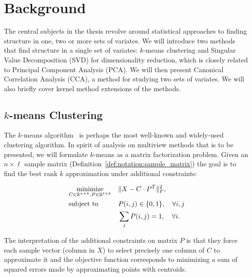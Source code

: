 %
\chapter{Background}\label{chap:background}

The central subjects in the thesis revolve around statistical approaches to finding structure in one, two or more sets of variates. We will
introduce two methods that find structure in a single set of variates: $k$-means clustering and Singular Value Decomposition (SVD) for dimensionality reduction, which is closely related to Principal Component Analysis (PCA). We will then present Canonical Correlation Analysis (CCA), a method for studying two sets of variates. We will also briefly cover kernel method extensions of the methods.


\section{$k$-means Clustering}\label{chap:background:kmeans}

The $k$-means algorithm~\cite{kmeans} is perhaps the most well-known and widely-used clustering algorithm. In spirit of analysis on multiview methods that is to be presented, we will formulate $k$-means as a matrix factorization problem. Given an $n \times \ell$ sample matrix (Definition~\ref{def:notation:sample_matrix})
the goal is to find the best rank $k$ approximation under additional constraints:

\begin{equation}\label{eq:background:kmeans:opt}
\begin{aligned}
& \underset{C \in \mathbb{R}^{n \times k}, P \in \mathbb{R}^{\ell \times k}}{\text{minimize}}
& & \lVert X - C \cdot P^T\rVert_F^2, \\
& \text{subject to}
& & P(i,j) \in \{0,1\}, \quad \forall i,j \\
& & & \sum_j P(i, j) = 1, \quad \forall i.
\end{aligned}
\end{equation}

The interpretation of the additional constraints on matrix $P$ is that they force each sample vector
(column in $X$) to select precisely one column of $C$ to approximate it and the objective function
corresponds to minimizing a sum of squared errors made by approximating points with centroids.

